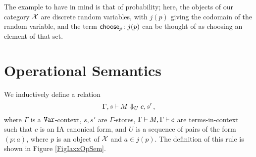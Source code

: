 \documentclass{report}[11pt]
\begin{document}
The example to have in mind is that of probability; here, the objects of our category $\mathcal X$ are discrete random variables, with $j(p)$ giving the codomain of the random variable, and the term $\operatorname{\mathsf{choose}}_p\colon j(p)$ can be thought of as choosing an element of that set.

\section{Operational Semantics}

We inductively define a relation
\[
  \Gamma,s\mathbin{\vdash} M\Downarrow_U c,s'\,,
  \]
where $\Gamma$ is a ${\mathtt{Var}}$-context, $s,s'$ are $\Gamma$-stores, $\Gamma\mathbin{\vdash} M,\Gamma\mathbin{\vdash} c$ are \IAXX terms-in-context such that $c$ is an IA canonical form, and $U$ is a sequence of pairs of the form $(p:a)$, where $p$ is an object of $\mathcal X$ and $a\in j(p)$.
The definition of this rule is shown in Figure \ref{FigIaxxOpSem}.
\end{document}
